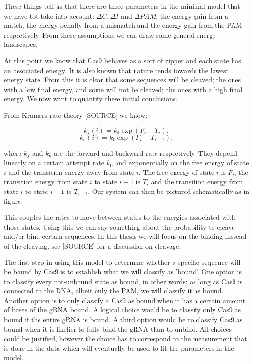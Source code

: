 These things tell us that there are three parameters in the minimal model that we have tot take into account: $\Delta C, \Delta I$ and $\Delta PAM$, the energy gain from a match, the energy penalty from a mismatch and the energy gain from the PAM respectively. From these assumptions we can draw some general energy landscapes.


At this point we know that Cas9 behaves as a sort of zipper and each state has an associated energy. It is also known that nature tends towards the lowest energy state. From this it is clear that some sequences will be cleaved; the ones with a low final energy, and some will not be cleaved; the ones with a high final energy. We now want to quantify these initial conclusions.

From Kramers rate theory [SOURCE] we know:

\begin{equation}
\label{eq:Kramer1}
k_f(i) = k_0 \exp{(F_i-T_i)},
\end{equation}
\begin{equation}
\label{eq:Kramer2}
k_b(i) = k_0 \exp{(F_i-T_{i-1})},
\end{equation}

where $k_f$ and $k_b$ are the forward and backward rate respectively. They depend linearly on a certain attempt rate $k_0$ and exponentially on the free energy of state $i$ and the transition energy away from state $i$. The free energy of state $i$ is $F_i$, the transition energy from state $i$ to state $i+1$ is $T_i$ and the transition energy from state $i$ to state $i-1$ is $T_{i-1}$. Our system can then be pictured schematically as in figure %


This couples the rates to move between states to the energies associated with those states. Using this we can say something about the probability to cleave and/or bind certain sequences. In this thesis we will focus on the binding instead of the cleaving, see [SOURCE] for a discussion on cleavage.

The first step in using this model to determine whether a specific sequence will be bound by Cas9 is to establish what we will classify as 'bound'. One option is to classify every not-unbound state as bound, in other words: as long as Cas9 is connected to the DNA, albeit only the PAM, we will classify it as bound. Another option is to only classify a Cas9 as bound when it has a certain amount of bases of the gRNA bound. A logical choice would be to classify only Cas9 as bound if the entire gRNA is bound. A third option would be to classify Cas9 as bound when it is likelier to fully bind the gRNA than to unbind. All choices could be justified, however the choice has to correspond to the measurement that is done in the data which will eventually be used to fit the parameters in the model.


